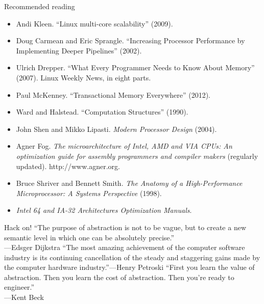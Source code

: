 \documentclass[mathserif,xcolor={dvipsnames,table}]{beamer}
\begin{document}
\begin{frame}{Recommended reading}
\footnotesize{
\begin{itemize}
\item Andi Kleen. ``Linux multi-core scalability'' (2009).
\item Doug Carmean and Eric Sprangle. ``Increasing Processor Performance by Implementing Deeper Pipelines'' (2002).
\item Ulrich Drepper. ``What Every Programmer Needs to Know About Memory'' (2007). Linux Weekly News, in eight parts.
\item Paul McKenney. ``Transactional Memory Everywhere'' (2012).
\item Ward and Halstead. ``Computation Structures'' (1990).
\item John Shen and Mikko Lipasti. \textit{Modern Processor Design} (2004).
\item Agner Fog. \textit{The microarchitecture of Intel, AMD and VIA CPUs: An optimization guide for assembly programmers and compiler makers} (regularly updated). http://www.agner.org.
\item Bruce Shriver and Bennett Smith. \textit{The Anatomy of a High-Performance Microprocessor: A Systems Perspective} (1998).
\item \textit{Intel 64 and IA-32 Architectures Optimization Manuals}.
\end{itemize}
}
\end{frame}

\begin{frame}{Hack on!}
``The purpose of abstraction is not to be vague, but to create a new semantic level in which one can be absolutely precise.''\\
\hfill---Edsger Dijkstra
\vfill
``The most amazing achievement of the computer software industry is its 
continuing cancellation of the steady and staggering gains made by the 
computer hardware industry.''\hfill---Henry Petroski
\vfill
\vfill
``First you learn the value of abstraction. Then you learn the cost of abstraction. Then you're ready to engineer.''\\
\hfill---Kent Beck
\end{frame}
\end{document}
